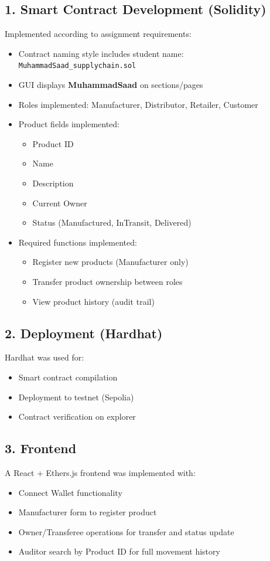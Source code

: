 \documentclass[12pt,a4paper]{article}
\begin{document}
\subsection{1. Smart Contract Development (Solidity)}
Implemented according to assignment requirements:
\begin{itemize}[leftmargin=*]
    \item Contract naming style includes student name: \texttt{MuhammadSaad\_supplychain.sol}
    \item GUI displays \textbf{MuhammadSaad} on sections/pages
    \item Roles implemented: Manufacturer, Distributor, Retailer, Customer
    \item Product fields implemented:
    \begin{itemize}[leftmargin=*]
        \item Product ID
        \item Name
        \item Description
        \item Current Owner
        \item Status (Manufactured, InTransit, Delivered)
    \end{itemize}
    \item Required functions implemented:
    \begin{itemize}[leftmargin=*]
        \item Register new products (Manufacturer only)
        \item Transfer product ownership between roles
        \item View product history (audit trail)
    \end{itemize}
\end{itemize}

\subsection{2. Deployment (Hardhat)}
Hardhat was used for:
\begin{itemize}[leftmargin=*]
    \item Smart contract compilation
    \item Deployment to testnet (Sepolia)
    \item Contract verification on explorer
\end{itemize}

\subsection{3. Frontend}
A React + Ethers.js frontend was implemented with:
\begin{itemize}[leftmargin=*]
    \item Connect Wallet functionality
    \item Manufacturer form to register product
    \item Owner/Transferee operations for transfer and status update
    \item Auditor search by Product ID for full movement history
\end{itemize}
\end{document}
